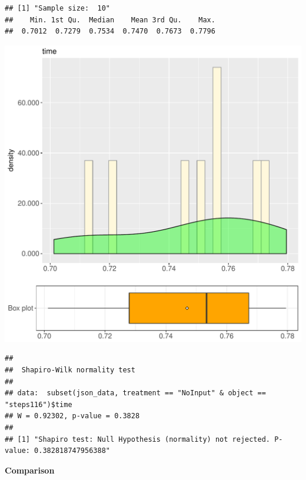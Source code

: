 \documentclass{article}\usepackage[]{graphicx}\usepackage[]{color}
\makeatletter
\def\maxwidth{ %
  \ifdim\Gin@nat@width>\linewidth
    \linewidth
  \else
    \Gin@nat@width
  \fi
}
\newenvironment{kframe}{%
 \def\at@end@of@kframe{}%
 \ifinner\ifhmode%
  \def\at@end@of@kframe{\end{minipage}}%
  \begin{minipage}{\columnwidth}%
 \fi\fi%
 \def\FrameCommand##1{\hskip\@totalleftmargin \hskip-\fboxsep
 \colorbox{shadecolor}{##1}\hskip-\fboxsep
     \hskip-\linewidth \hskip-\@totalleftmargin \hskip\columnwidth}%
 \MakeFramed {\advance\hsize-\width
   \@totalleftmargin\z@ \linewidth\hsize
   \@setminipage}}%
 {\par\unskip\endMakeFramed%
 \at@end@of@kframe}
\newenvironment{knitrout}{}{} %
\makeatother
\begin{document}
\begin{knitrout}
\color{fgcolor}\begin{kframe}
\begin{verbatim}
## [1] "Sample size:  10"
##    Min. 1st Qu.  Median    Mean 3rd Qu.    Max. 
##  0.7012  0.7279  0.7534  0.7470  0.7673  0.7796
\end{verbatim}
\end{kframe}
\includegraphics[width=\maxwidth]{figure/RH4_NoInput_steps116-1} 
\begin{kframe}\begin{verbatim}
## 
## 	Shapiro-Wilk normality test
## 
## data:  subset(json_data, treatment == "NoInput" & object == "steps116")$time
## W = 0.92302, p-value = 0.3828
## 
## [1] "Shapiro test: Null Hypothesis (normality) not rejected. P-value: 0.382818747956388"
\end{verbatim}
\end{kframe}
\end{knitrout}
  
 \textbf{Comparison}
  
\end{document}
